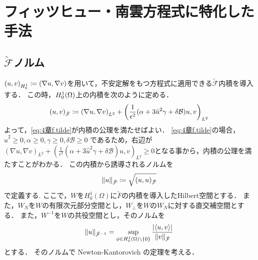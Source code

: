 \chapter{フィッツヒュー・南雲方程式に特化した手法}\label{Proposing}


\section{\(\tilde{\mathcal{F}}\)ノルム}
\(\qty(u,v)_{H^1_0}\coloneqq\qty(\nabla u,\nabla v)\)を用いて，不安定解をもつ方程式に適用できる\(\tilde{\mathcal{F}}\)内積を導入する．
この時，\(H^1_0\qty(\Omega)\)上の内積を次のように定める．
\begin{align}\label{eq:4章f.tilde}
    \qty(u,v)_{\tilde{\mathcal{F}}}\coloneqq\qty(\nabla u,\nabla v)_{L^2}+\qty(\dfrac{1}{\epsilon^2}(\alpha + 3\hat{u}^2\gamma +\delta \mathcal{B})u,v)_{L^2}
\end{align}
よって，\eqref{eq:4章f.tilde}が内積の公理を満たせばよい．
\eqref{eq:4章f.tilde}の場合，
\(\hat{u}^2 \geq 0,\alpha \geq 0,\gamma \geq 0, \delta \mathcal{B} \geq 0\)
であるため，右辺が\((\nabla u,\nabla v)_{L^2}+(\frac{1}{\epsilon^2}(\alpha + 3\hat{u}^2\gamma +\delta \mathcal{B})u,v)_{L^2}\geq 0\)となる事から，内積の公理を満たすことがわかる．
この内積から誘導されるノルムを
\begin{align}
    \norm{u}_{\tilde{\mathcal{F}}} \coloneqq \sqrt{(u,u)_{\tilde{\mathcal{F}}}}
\end{align}
で定義する.
ここで，\(W\)を\(H^1_0(\Omega)\)に\(\tilde{F}\)の内積を導入したHilbert空間とする．
また，\(W_N\)を\(W\)の有限次元部分空間とし，\(W_\perp\)を\(W\)の\(W_N\)に対する直交補空間とする．
また，\(W^{-1}\)を\(W\)の共役空間とし，そのノルムを
\begin{align}
  \norm{u}_{\tilde{\mathcal{F}}^{-1}}
    =
   \sup\limits_{\phi \in H^1_0(\Omega) \backslash \{ 0 \} }
   \frac{|\langle u,v \rangle|}{\norm{v}_{\tilde{\mathcal{F}}}}
\end{align}
とする．
そのノルムで Newton-Kantorovich の定理を考える．

